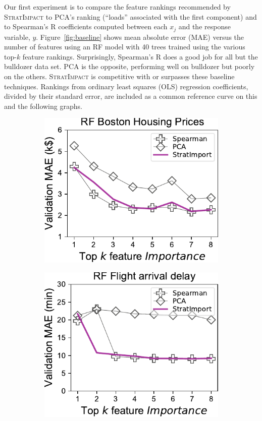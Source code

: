 \documentclass[11pt]{article}
\newcommand{\figref}[1]{Figure~\ref{#1}}
\newcommand{\simp}{\fontfamily{cmr}\textsc{\small StratImpact}}
\begin{document}
Our first experiment is to compare the feature rankings recommended by \simp{} to PCA's ranking (``loads'' associated with the first component) and to Spearman's R coefficients computed between each $x_j$ and the response variable, $y$. \figref{fig:baseline} shows mean absolute error  (MAE) versus the number of features using an RF model with 40 trees trained using the various top-$k$ feature rankings. Surprisingly, Spearman's R does a good job for all but the bulldozer data set. PCA is the opposite, performing well on bulldozer but poorly on the others. \simp{} is competitive with or surpasses these baseline techniques.  Rankings from ordinary least squares (OLS) regression coefficients, divided by their standard error, are included as a common reference curve on this and the following graphs. 

\begin{figure}
\centering
\begin{subfigure}{.245\textwidth}
    \centering
\includegraphics[scale=0.45]{images/boston-topk-RF-baseline.pdf}
\subcaption{}
\end{subfigure}%
\begin{subfigure}{.245\textwidth}
    \centering
\includegraphics[scale=0.45]{images/flights-topk-RF-baseline.pdf}

\end{subfigure}
\end{figure}
\end{document}
